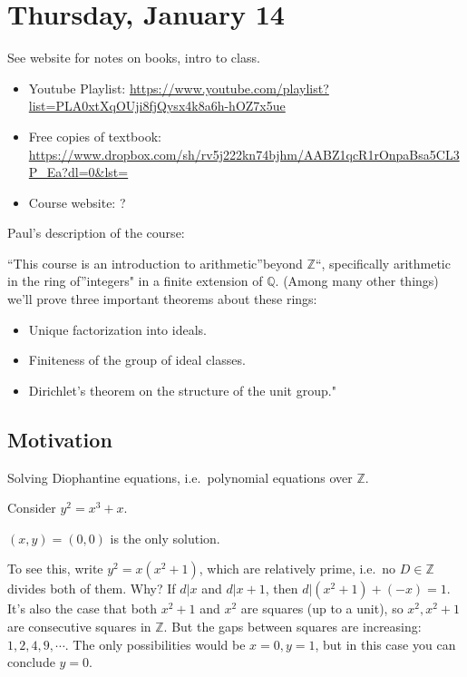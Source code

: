 \newpage

\tableofcontents
\newpage

\hypertarget{thursday-january-14}{%
\section{Thursday, January 14}\label{thursday-january-14}}

See website for notes on books, intro to class.

\begin{itemize}
\item
  Youtube Playlist:
  \url{https://www.youtube.com/playlist?list=PLA0xtXqOUji8fjQysx4k8a6h-hOZ7x5ue}
\item
  Free copies of textbook:
  \url{https://www.dropbox.com/sh/rv5j222kn74bjhm/AABZ1qcR1rOnpaBsa5CL3P_Ea?dl=0\&lst=}
\item
  Course website: ?
\end{itemize}

Paul's description of the course:

``This course is an introduction to arithmetic''beyond
\({\mathbb{Z}}\)``, specifically arithmetic in the ring of''integers" in
a finite extension of \({\mathbb{Q}}\). (Among many other things) we'll
prove three important theorems about these rings:

\begin{itemize}
\tightlist
\item
  Unique factorization into ideals.
\item
  Finiteness of the group of ideal classes.
\item
  Dirichlet's theorem on the structure of the unit group."
\end{itemize}

\hypertarget{motivation}{%
\subsection{Motivation}\label{motivation}}

Solving Diophantine equations, i.e.~polynomial equations over
\({\mathbb{Z}}\).

\begin{example}[?]

Consider \(y^2 = x^3 + x\).

\begin{claim}

\((x, y) = (0, 0)\) is the only solution.

\end{claim}

To see this, write \(y^2 = x(x^2+1)\), which are relatively prime,
i.e.~no \(D\in {\mathbb{Z}}\) divides both of them. Why? If
\(d \mathrel{\Big|}x\) and \(d \mathrel{\Big|}x+1\), then
\(d\mathrel{\Big|}(x^2+1) + (-x) = 1\). It's also the case that both
\(x^2+1\) and \(x^2\) are squares (up to a unit), so \(x^2, x^2 + 1\)
are consecutive squares in \({\mathbb{Z}}\). But the gaps between
squares are increasing: \(1, 2, 4, 9, \cdots\). The only possibilities
would be \(x=0, y=1\), but in this case you can conclude \(y=0\).

\end{example}

